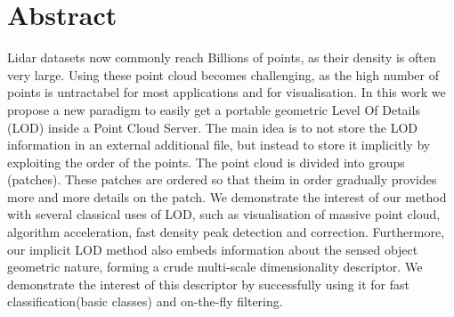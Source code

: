  
\section{Abstract}
	Lidar datasets now commonly reach Billions of points, as their density is often very large. 
	Using these point cloud becomes challenging, as the high number of points is untractabel for most applications and for visualisation.
	In this work we propose a new paradigm to easily get a portable geometric Level Of Details (LOD) inside a Point Cloud Server.
	The main idea is to not store the LOD information in an external additional file, but instead to store it implicitly by exploiting the order of the points.
	The point cloud is divided into groups (patches). These patches are ordered so that theim in order gradually provides more and more details on the patch. 
	We demonstrate the interest of our method with several classical uses of LOD, such as visualisation of massive point cloud, algorithm acceleration,  fast density peak detection and correction.
	Furthermore, our implicit LOD method also embeds information about the sensed object geometric nature, forming a crude multi-scale dimensionality descriptor.
	We demonstrate the interest of this descriptor by successfully using it for fast classification(basic classes) and on-the-fly filtering. 
	 
	